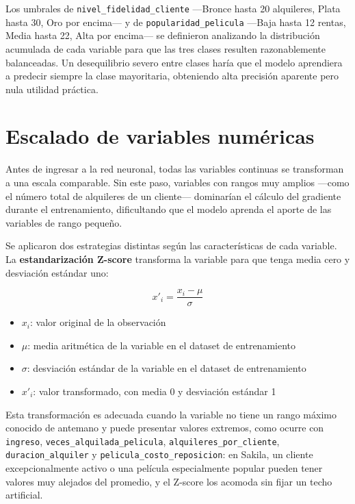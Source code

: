 \documentclass[12pt, a4paper]{report}
\newcommand{\variable}[1]{\texttt{\small #1}}
\begin{document}
Los umbrales de \variable{nivel\_fidelidad\_cliente} ---Bronce hasta 20 alquileres, Plata hasta 30, Oro por encima--- y de \variable{popularidad\_pelicula} ---Baja hasta 12 rentas, Media hasta 22, Alta por encima--- se definieron analizando la distribución acumulada de cada variable para que las tres clases resulten razonablemente balanceadas. Un desequilibrio severo entre clases haría que el modelo aprendiera a predecir siempre la clase mayoritaria, obteniendo alta precisión aparente pero nula utilidad práctica.

\section{Escalado de variables numéricas}

Antes de ingresar a la red neuronal, todas las variables continuas se transforman a una escala comparable. Sin este paso, variables con rangos muy amplios ---como el número total de alquileres de un cliente--- dominarían el cálculo del gradiente durante el entrenamiento, dificultando que el modelo aprenda el aporte de las variables de rango pequeño.

Se aplicaron dos estrategias distintas según las características de cada variable. La \textbf{estandarización Z-score} transforma la variable para que tenga media cero y desviación estándar uno:

\[
  x'_i = \frac{x_i - \mu}{\sigma}
\]

\begin{itemize}
  \item $x_i$: valor original de la observación
  \item $\mu$: media aritmética de la variable en el dataset de entrenamiento
  \item $\sigma$: desviación estándar de la variable en el dataset de entrenamiento
  \item $x'_i$: valor transformado, con media 0 y desviación estándar 1
\end{itemize}

Esta transformación es adecuada cuando la variable no tiene un rango máximo conocido de antemano y puede presentar valores extremos, como ocurre con \variable{ingreso}, \variable{veces\_alquilada\_pelicula}, \variable{alquileres\_por\_cliente}, \variable{duracion\_alquiler} y \variable{pelicula\_costo\_reposicion}: en Sakila, un cliente excepcionalmente activo o una película especialmente popular pueden tener valores muy alejados del promedio, y el Z-score los acomoda sin fijar un techo artificial.
\end{document}
